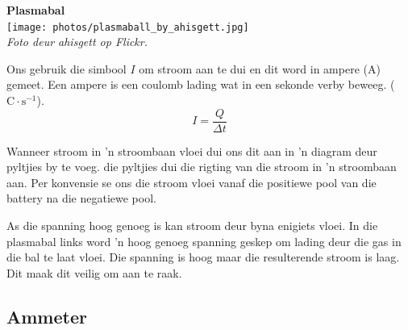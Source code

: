 \begin{minipage}{.5\textwidth}
\begin{center}
\textbf{Plasmabal}\\
\texttt{[image: photos/plasmaball\_by\_ahisgett.jpg]}\\
\textit{Foto deur ahisgett op Flickr.}
\end{center}   
\end{minipage}
\begin{minipage}{.5\textwidth}
Ons gebruik die simbool $I$ om stroom aan te dui en dit word in ampere
(A) gemeet. Een ampere is een coulomb lading wat in een sekonde verby beweeg.
($\text{C} \cdot \text{s}^{-1}$).
\begin{equation*}
\boxed{I = \frac{Q}{\Delta t}}
\end{equation*}

Wanneer stroom in  'n stroombaan vloei dui ons dit aan in  'n diagram deur
pyltjies by te voeg. die pyltjies dui die rigting van die
stroom in  'n stroombaan aan. Per konvensie se ons die stroom vloei vanaf die
positiewe pool van die battery na die negatiewe pool.

As die spanning hoog genoeg is kan stroom deur byna enigiets vloei. In die
plasmabal links word  'n hoog genoeg spanning geskep om lading deur die gas in
die bal te laat vloei. Die spanning is hoog maar die resulterende stroom is
laag. Dit maak dit veilig om aan te raak.
\end{minipage}




\subsection*{Ammeter}


